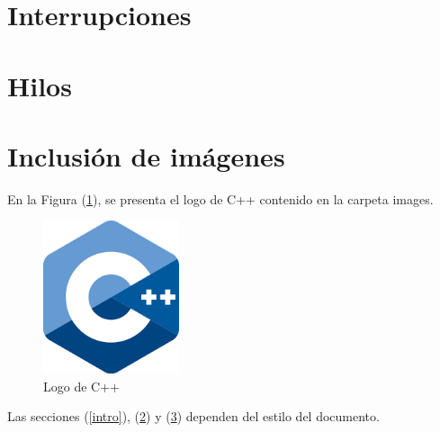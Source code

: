 \documentclass{article}
\begin{document}
\section{Interrupciones} \label{contenido}
\newpage
\section{Hilos} \label{contenido}
\newpage
\section{Inclusión de imágenes} \label{imagenes}


En la Figura (\ref{fig:cpplogo}), se presenta el logo de C++ contenido en la carpeta images.

\begin{figure}[h]
\includegraphics[width=4cm]{cpplogo.png}
\centering
\caption{Logo de C++}
\label{fig:cpplogo}
\end{figure}

Las secciones (\ref{intro}), (\ref{contenido}) y (\ref{imagenes}) dependen del estilo del documento.



\end{document}
